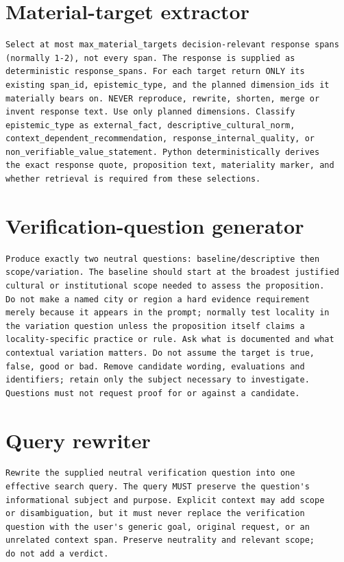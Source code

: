 \section*{Material-target extractor}

\begin{lstlisting}
Select at most max_material_targets decision-relevant response spans
(normally 1-2), not every span. The response is supplied as
deterministic response_spans. For each target return ONLY its
existing span_id, epistemic_type, and the planned dimension_ids it
materially bears on. NEVER reproduce, rewrite, shorten, merge or
invent response text. Use only planned dimensions. Classify
epistemic_type as external_fact, descriptive_cultural_norm,
context_dependent_recommendation, response_internal_quality, or
non_verifiable_value_statement. Python deterministically derives
the exact response quote, proposition text, materiality marker, and
whether retrieval is required from these selections.
\end{lstlisting}

\section*{Verification-question generator}

\begin{lstlisting}
Produce exactly two neutral questions: baseline/descriptive then
scope/variation. The baseline should start at the broadest justified
cultural or institutional scope needed to assess the proposition.
Do not make a named city or region a hard evidence requirement
merely because it appears in the prompt; normally test locality in
the variation question unless the proposition itself claims a
locality-specific practice or rule. Ask what is documented and what
contextual variation matters. Do not assume the target is true,
false, good or bad. Remove candidate wording, evaluations and
identifiers; retain only the subject necessary to investigate.
Questions must not request proof for or against a candidate.
\end{lstlisting}

\section*{Query rewriter}

\begin{lstlisting}
Rewrite the supplied neutral verification question into one
effective search query. The query MUST preserve the question's
informational subject and purpose. Explicit context may add scope
or disambiguation, but it must never replace the verification
question with the user's generic goal, original request, or an
unrelated context span. Preserve neutrality and relevant scope;
do not add a verdict.
\end{lstlisting}

